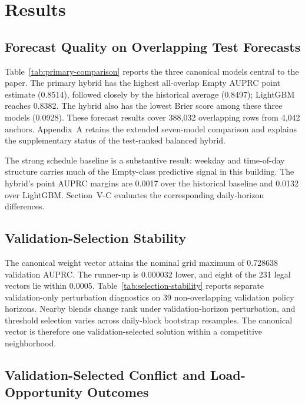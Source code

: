\section{Results}

\subsection{Forecast Quality on Overlapping Test Forecasts}

Table~\ref{tab:primary-comparison} reports the three canonical models central to the paper. The primary hybrid has the highest all-overlap Empty AUPRC point estimate (0.8514), followed closely by the historical average (0.8497); LightGBM reaches 0.8382. The hybrid also has the lowest Brier score among these three models (0.0928). These forecast results cover 388,032 overlapping rows from 4,042 anchors. Appendix~A retains the extended seven-model comparison and explains the supplementary status of the test-ranked balanced hybrid.



The strong schedule baseline is a substantive result: weekday and time-of-day structure carries much of the Empty-class predictive signal in this building. The hybrid's point AUPRC margins are 0.0017 over the historical baseline and 0.0132 over LightGBM. Section~V-C evaluates the corresponding daily-horizon differences.

\subsection{Validation-Selection Stability}

The canonical weight vector attains the nominal grid maximum of 0.728638 validation AUPRC. The runner-up is 0.000032 lower, and eight of the 231 legal vectors lie within 0.0005. Table~\ref{tab:selection-stability} reports separate validation-only perturbation diagnostics on 39 non-overlapping validation policy horizons. Nearby blends change rank under validation-horizon perturbation, and threshold selection varies across daily-block bootstrap resamples. The canonical vector is therefore one validation-selected solution within a competitive neighborhood.



\subsection{Validation-Selected Conflict and Load-Opportunity Outcomes}

